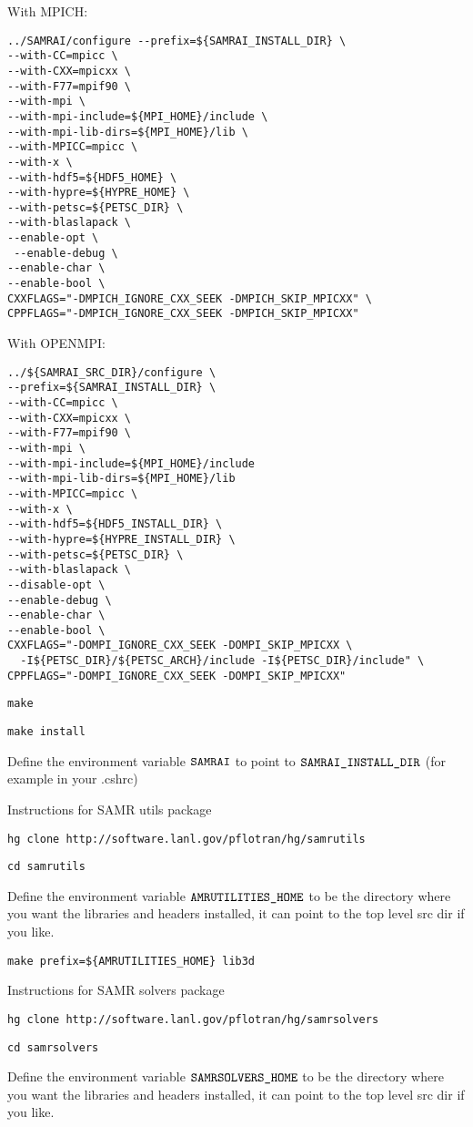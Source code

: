 \documentclass[12pt]{article}
\begin{document}
\noindent
With MPICH:
\begin{verbatim}
../SAMRAI/configure --prefix=${SAMRAI_INSTALL_DIR} \
--with-CC=mpicc \
--with-CXX=mpicxx \
--with-F77=mpif90 \
--with-mpi \
--with-mpi-include=${MPI_HOME}/include \
--with-mpi-lib-dirs=${MPI_HOME}/lib \
--with-MPICC=mpicc \
--with-x \
--with-hdf5=${HDF5_HOME} \
--with-hypre=${HYPRE_HOME} \
--with-petsc=${PETSC_DIR} \
--with-blaslapack \
--enable-opt \
 --enable-debug \
--enable-char \
--enable-bool \
CXXFLAGS="-DMPICH_IGNORE_CXX_SEEK -DMPICH_SKIP_MPICXX" \
CPPFLAGS="-DMPICH_IGNORE_CXX_SEEK -DMPICH_SKIP_MPICXX"
\end{verbatim}

\noindent
With OPENMPI:
\begin{verbatim}
../${SAMRAI_SRC_DIR}/configure \
--prefix=${SAMRAI_INSTALL_DIR} \
--with-CC=mpicc \
--with-CXX=mpicxx \
--with-F77=mpif90 \
--with-mpi \
--with-mpi-include=${MPI_HOME}/include 
--with-mpi-lib-dirs=${MPI_HOME}/lib 
--with-MPICC=mpicc \
--with-x \
--with-hdf5=${HDF5_INSTALL_DIR} \
--with-hypre=${HYPRE_INSTALL_DIR} \
--with-petsc=${PETSC_DIR} \
--with-blaslapack \
--disable-opt \
--enable-debug \
--enable-char \
--enable-bool \
CXXFLAGS="-DOMPI_IGNORE_CXX_SEEK -DOMPI_SKIP_MPICXX \
  -I${PETSC_DIR}/${PETSC_ARCH}/include -I${PETSC_DIR}/include" \
CPPFLAGS="-DOMPI_IGNORE_CXX_SEEK -DOMPI_SKIP_MPICXX"
\end{verbatim}

{\tt make}

{\tt make install}

Define the environment variable $\verb|SAMRAI|$ to point to $\verb|SAMRAI_INSTALL_DIR|$ (for example in your .cshrc)

Instructions for SAMR utils package

{\tt hg clone  http://software.lanl.gov/pflotran/hg/samrutils}

{\tt cd samrutils}

Define the environment variable $\verb|AMRUTILITIES_HOME|$ to be the directory where you want the libraries and headers installed, it can point to the top level src dir if you like.

\verb|make prefix=${AMRUTILITIES_HOME} lib3d|

Instructions for SAMR solvers package

{\tt hg clone  http://software.lanl.gov/pflotran/hg/samrsolvers}

{\tt cd samrsolvers}

Define the environment variable $\verb|SAMRSOLVERS_HOME|$ to be the directory where you want the libraries and headers installed, it can point to the top level src dir if you like.
\end{document}
